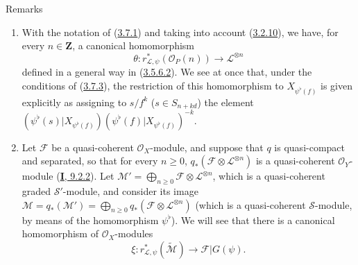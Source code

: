 \begin{namedtheorem}[3.7.9]{Remarks}
\label{II.3.7.9}
\begin{enumerate}
  \item[(i)] With the notation of \textup{(\hyperref[II.3.7.1]{3.7.1})} and
    taking into account \textup{(\hyperref[II.3.2.10]{3.2.10})}, we have, for every
    $n\in\mathbf{Z}$, a canonical homomorphism
    \[
    \label{II.3.7.9.1}
      \theta:r_{\mathcal{L},\psi}^*(\mathcal{O}_P(n))\longrightarrow
      \mathcal{L}^{\otimes n}
    \tag{3.7.9.1}
    \]
    defined in a general way in
    \textup{(\hyperref[II.3.5.6.2]{3.5.6.2})}. We see at once that, under the
    conditions of \textup{(\hyperref[II.3.7.3]{3.7.3})}, the restriction of this
    homomorphism to $X_{\psi^\flat(f)}$ is given explicitly as assigning
    to $s/f^k$ ($s\in S_{n+kd}$) the element
    $(\psi^\flat(s)|X_{\psi^\flat(f)})
    (\psi^\flat(f)|X_{\psi^\flat(f)})^{-k}$.
  \item[(ii)] Let $\mathcal{F}$ be a quasi-coherent $\mathcal{O}_X$-module, and
    suppose that $q$ is quasi-compact and separated, so that for every
    $n\geq0$, $q_*(\mathcal{F}\otimes\mathcal{L}^{\otimes n})$ is a
    quasi-coherent $\mathcal{O}_Y$-module
    \textup{(\hyperref[I.9.2.2]{\textbf{I}, 9.2.2})}. Let
    $\mathcal{M}'=\bigoplus_{n\geq0}\mathcal{F}\otimes
    \mathcal{L}^{\otimes n}$, which is a quasi-coherent graded
    $\mathcal{S}'$-module, and consider its image
    $\mathcal{M}=q_*(\mathcal{M}')=
    \bigoplus_{n\geq0}q_*(\mathcal{F}\otimes\mathcal{L}^{\otimes n})$
    (which is a quasi-coherent $\mathcal{S}$-module, by means of
    the homomorphism $\psi^\flat$). We will see that there is a
    canonical homomorphism of $\mathcal{O}_X$-modules
    \[
    \label{II.3.7.9.2}
      \xi:r_{\mathcal{L},\psi}^*(\widetilde{\mathcal{M}})
      \longrightarrow\mathcal{F}|G(\psi).
    \tag{3.7.9.2}
    \]


\end{enumerate}
\end{namedtheorem}

